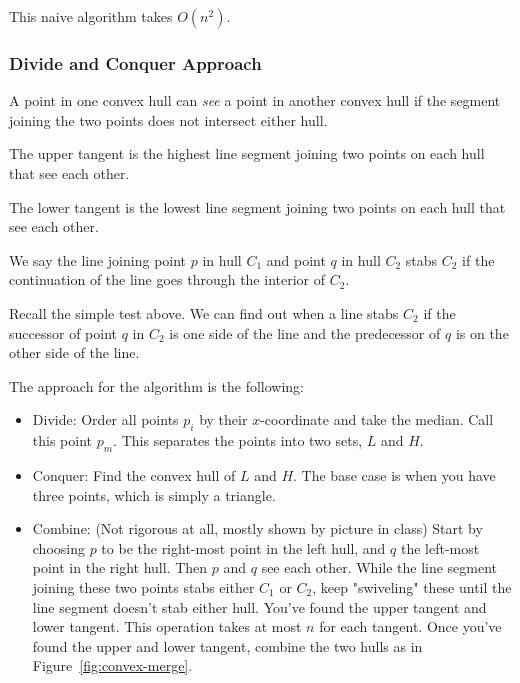 This naive algorithm takes $O(n^2)$.


\subsubsection{Divide and Conquer Approach}

\begin{definition}
    A point in one convex hull can \emph{see} a point in another
    convex hull if the segment joining the two points does not
    intersect either hull.
\end{definition}

\begin{definition}
    The upper tangent is the highest line segment joining two points
    on each hull that see each other.
\end{definition}

\begin{definition}
    The lower tangent is the lowest line segment joining two points
    on each hull that see each other.
\end{definition}

\begin{definition}
    We say the line joining point $p$ in hull $C_1$ and point $q$ in
    hull $C_2$ stabs $C_2$ if the continuation of the line goes
    through the interior of $C_2$.
\end{definition}

\begin{remark}
    Recall the simple test above. We can find out when a line stabs
    $C_2$ if the successor of point
    $q$ in $C_2$ is one side of the line and the predecessor of $q$ is
    on the other side of the line.
\end{remark}

The approach for the algorithm is the following:

\begin{itemize}
    \item Divide: Order all points $p_i$ by their $x$-coordinate and
    take the median. Call this point $p_m$. This separates the points
    into two sets, $L$ and $H$.
    \item Conquer: Find the convex hull of $L$ and $H$. The base case
    is when you have three points, which is simply a triangle.
    \item Combine: (Not rigorous at all, mostly shown by picture in
    class) Start by choosing $p$ to be the right-most point in
    the left hull, and $q$ the left-most point in the right hull. Then
    $p$ and $q$ see each other. While the line segment joining these
    two points stabs either $C_1$ or $C_2$, keep "swiveling" these
    until the line segment doesn't stab either hull. You've found the
    upper tangent and lower tangent. This operation takes at most $n$
    for each tangent. Once you've found the upper and lower tangent,
    combine the two hulls as in Figure~\ref{fig:convex-merge}.
\end{itemize}

